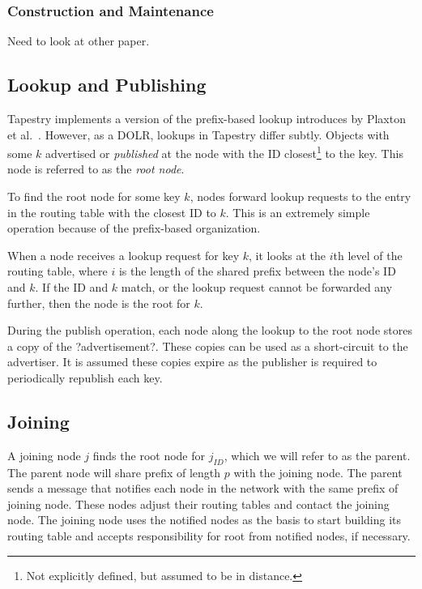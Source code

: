 \documentclass[10pt,letterpaper,twoside]{report}
\begin{document}
\subsubsection*{Construction and Maintenance}
Need to look at other paper.

\subsection*{Lookup and Publishing}
Tapestry \cite{tapestry} implements a version of the prefix-based lookup introduces by Plaxton et al.\ \cite{prr}. 
However, as a DOLR, lookups in Tapestry differ subtly.
Objects with some $k$ advertised or \textit{published} at the node with the ID closest\footnote{Not explicitly defined, but assumed to be in distance.} to the key.
This node is referred to as the \textit{root node}.

To find the root node for some key $k$, nodes forward lookup requests to the entry in the routing table with the closest ID to $k$. 
This is an extremely simple operation because of the prefix-based organization.

When a node receives a lookup request for key $k$, it looks at the $i$th level of the routing table, where $i$ is the length of the shared prefix between the node's ID and $k$.
If the ID and $k$ match, or the lookup request cannot be forwarded any further, then the node is the root for $k$.

During the publish operation, each node along the lookup to the root node stores a copy of the ?advertisement?. 
These copies can be used as a short-circuit to the advertiser.
It is assumed these copies expire as the publisher is required to periodically republish each key.



\subsection*{Joining}

A joining node $j$ finds the root node for $j_{ID}$, which we will refer to as the parent.
The parent node will share prefix of length $p$ with the joining node.
The parent sends a message  that notifies each node in the network with the same prefix of joining node.
These nodes adjust their routing tables and contact the joining node.
The joining node uses the notified nodes as the basis to start building its routing table and accepts responsibility for root from notified nodes, if necessary.
\end{document}
